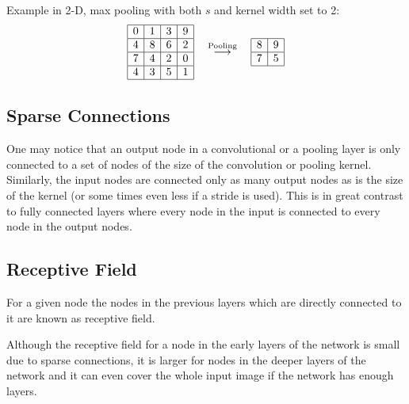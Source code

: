 \documentclass[]{article}
\begin{document}
Example in 2-D, max pooling with both $s$ and kernel width set to 2:
\[
\begin{array}{|c|c|c|c|}
  \hline
  0 & 1 & 3 & 9\\
  \hline
  4 & 8 & 6 & 2\\
  \hline
  7 & 4 & 2 & 0\\
  \hline
  4 & 3 & 5 & 1\\
  \hline
 \end{array}
 \quad \stackrel{\text{Pooling}}{\longrightarrow} \quad
 \begin{array}{|c|c|}
   \hline
   8 & 9\\
   \hline
   7 & 5\\
   \hline
  \end{array}
 \]

\subsection{Sparse Connections}
One may notice that an output node in a convolutional or a pooling layer is only
connected to a set of nodes of the size of the convolution or pooling kernel.
Similarly, the input nodes are connected only as many output nodes as is the size
of the kernel (or some times even less if a stride is used). This is in great contrast
to fully connected layers where every node in the input is connected to every node
in the output nodes.


\subsection{Receptive Field}
For a given node the nodes in the previous layers which are directly connected
to it are known as receptive field.

Although the receptive field for a node in the early layers of the network is small
due to sparse connections, it is larger for nodes in the deeper layers of the network
and it can even cover the whole input image if the network has enough layers.
\end{document}
